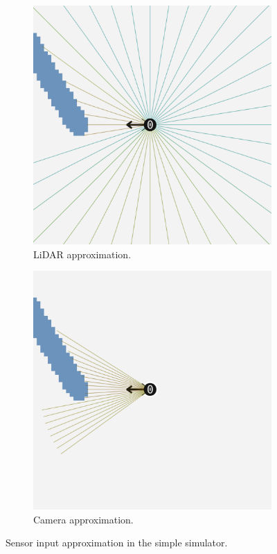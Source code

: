 \begin{figure}[H]
    \centering
    \begin{subfigure}[b]{0.45\textwidth}
        \centering
        \includegraphics[width=\textwidth]{figures/screenshots/simple-lidar.png}
        \caption{LiDAR approximation.}
        \label{fig:lidar-approximation}
    \end{subfigure}
    \hfill
    \begin{subfigure}[b]{0.45\textwidth}
        \centering
        \includegraphics[width=\textwidth]{figures/screenshots/simple-camera.png}
        \caption{Camera approximation.}
        \label{fig:camera-approximation}
    \end{subfigure}
    \caption{Sensor input approximation in the simple simulator.}
    \label{fig:sensor-approximation}
\end{figure}

